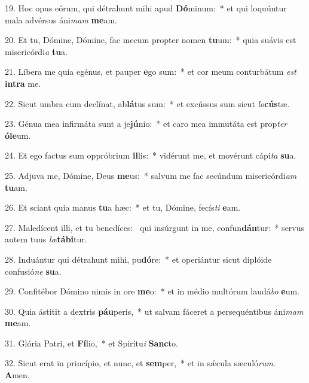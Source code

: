 19. Hoc opus eórum, qui détrahunt mihi apud \textbf{Dó}minum:~*  et qui loquúntur mala advérsus áni\textit{mam} \textbf{me}am.\

20. Et tu, Dómine, Dómine, fac mecum propter nomen \textbf{tu}um:~*  quia suávis est misericórdi\textit{a} \textbf{tu}a.\

21. Líbera me quia egénus, et pauper \textbf{e}go sum:~*  et cor meum conturbátum \textit{est} \textbf{in}\textbf{tra} me.\

22. Sicut umbra cum declínat, ab\textbf{lá}tus sum:~*  et excússus sum sicut \textit{lo}\textbf{cús}tæ.\

23. Génua mea infirmáta sunt a je\textbf{jú}nio:~*  et caro mea immutáta est prop\textit{ter} \textbf{ó}\textbf{le}um.\

24. Et ego factus sum oppróbrium \textbf{il}lis:~*  vidérunt me, et movérunt cápi\textit{ta} \textbf{su}a.\

25. Adjuva me, Dómine, Deus \textbf{me}us:~*  salvum me fac secúndum misericórdi\textit{am} \textbf{tu}am.\

26. Et sciant quia manus \textbf{tu}a hæc:~*  et tu, Dómine, fecís\textit{ti} \textbf{e}am.\

27. Maledícent illi, et tu benedíces: \dag\  qui insúrgunt in me, confun\textbf{dán}tur:~*  servus autem tuus \textit{læ}\textbf{tá}\textbf{bi}tur.\

28. Induántur qui détrahunt mihi, pu\textbf{dó}re:~*  et operiántur sicut diplóide confusió\textit{ne} \textbf{su}a.\

29. Confitébor Dómino nimis in ore \textbf{me}o:~*  et in médio multórum laudá\textit{bo} \textbf{e}um.\

30. Quia ástitit a dextris \textbf{páu}peris,~*  ut salvam fáceret a persequéntibus áni\textit{mam} \textbf{me}am.\

31. Glória Patri, et \textbf{Fí}lio,~*  et Spirítu\textit{i} \textbf{Sanc}to.\

32. Sicut erat in princípio, et nunc, et \textbf{sem}per,~*  et in sǽcula sæculó\textit{rum}. \textbf{A}men.\


